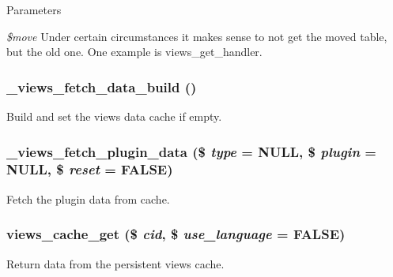 \begin{DoxyParams}{Parameters}
\item[{\em \$move}]Under certain circumstances it makes sense to not get the moved table, but the old one. One example is views\_\-get\_\-handler. \end{DoxyParams}
\hypertarget{views_2includes_2cache_8inc_ab32ccf6a813b8037d2552ed0d54125f9}{
\subsubsection[{\_\-views\_\-fetch\_\-data\_\-build}]{\setlength{\rightskip}{0pt plus 5cm}\_\-views\_\-fetch\_\-data\_\-build ()}}
\label{views_2includes_2cache_8inc_ab32ccf6a813b8037d2552ed0d54125f9}
Build and set the views data cache if empty. \hypertarget{views_2includes_2cache_8inc_a70217d418b60499c49aaa469712a8501}{
\subsubsection[{\_\-views\_\-fetch\_\-plugin\_\-data}]{\setlength{\rightskip}{0pt plus 5cm}\_\-views\_\-fetch\_\-plugin\_\-data (\$ {\em type} = {\ttfamily NULL}, \/  \$ {\em plugin} = {\ttfamily NULL}, \/  \$ {\em reset} = {\ttfamily FALSE})}}
\label{views_2includes_2cache_8inc_a70217d418b60499c49aaa469712a8501}
Fetch the plugin data from cache. \hypertarget{views_2includes_2cache_8inc_a3d4e5b21bcf4c7cc327190ece3251555}{
\subsubsection[{views\_\-cache\_\-get}]{\setlength{\rightskip}{0pt plus 5cm}views\_\-cache\_\-get (\$ {\em cid}, \/  \$ {\em use\_\-language} = {\ttfamily FALSE})}}
\label{views_2includes_2cache_8inc_a3d4e5b21bcf4c7cc327190ece3251555}
Return data from the persistent views cache.

